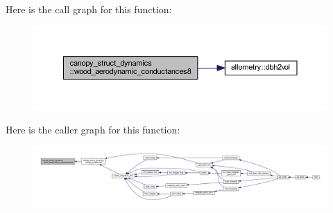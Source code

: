Here is the call graph for this function\+:\nopagebreak
\begin{figure}[H]
\begin{center}
\leavevmode
\includegraphics[width=350pt]{namespacecanopy__struct__dynamics_ac0b8111bae6ded12c5757262b058d989_cgraph}
\end{center}
\end{figure}




Here is the caller graph for this function\+:\nopagebreak
\begin{figure}[H]
\begin{center}
\leavevmode
\includegraphics[width=350pt]{namespacecanopy__struct__dynamics_ac0b8111bae6ded12c5757262b058d989_icgraph}
\end{center}
\end{figure}


